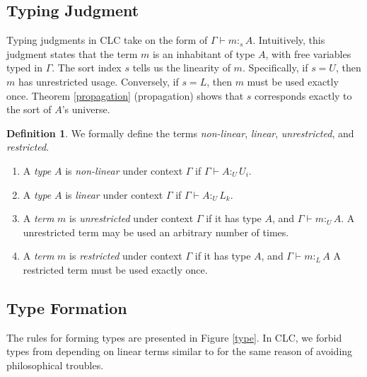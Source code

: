 \documentclass{article}
\theoremstyle{definition}
\newtheorem{definition}{Definition}[section]
\newcommand{\utype}{:_{\scriptscriptstyle U}}
\newcommand{\ltype}{:_{\scriptscriptstyle L}}
\newcommand{\stype}[1]{:_#1}
\begin{document}
  \subsection{Typing Judgment}
  Typing judgments in CLC take on the form of $\Gamma \vdash m \stype{s} A$. Intuitively, this judgment states that the term $m$ is an inhabitant of type $A$, with free variables typed in $\Gamma$. The sort index $s$ tells us the linearity of $m$. Specifically, if $s = U$, then $m$ has unrestricted usage. Conversely, if $s = L$, then $m$ must be used exactly once. Theorem \ref{propagation} (propagation) shows that $s$ corresponds exactly to the sort of $A$'s universe.

  \begin{definition} We formally define the terms \textit{non-linear}, \textit{linear}, \textit{unrestricted}, and \textit{restricted}.
    \begin{enumerate}
      \item A \textit{type} $A$ is \textit{non-linear} under context $\Gamma$ if $\Gamma \vdash A \utype U_i$.
      \item A \textit{type} $A$ is \textit{linear} under context $\Gamma$ if $\Gamma \vdash A \utype L_k$.
      \item A \textit{term} $m$ is \textit{unrestricted} under context $\Gamma$ if it has type $A$, and $\Gamma \vdash m \utype A$. A unrestricted term may be used an arbitrary number of times.
      \item A \textit{term} $m$ is \textit{restricted} under context $\Gamma$ if it has type $A$, and $\Gamma \vdash m \ltype A$ A restricted term must be used exactly once.
    \end{enumerate}
  \end{definition}

  \subsection{Type Formation} \label{tyformation}
  The rules for forming types are presented in Figure \ref{type}. In CLC, we forbid types from depending on linear terms similar to \cite{llf,neel15} for the same reason of avoiding philosophical troubles.
\end{document}
